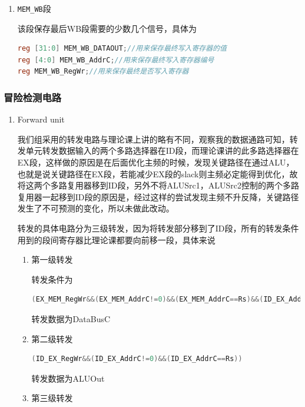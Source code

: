 \documentclass{ctexart}
\begin{document}
\begin{enumerate}
			\item \verb"MEM_WB"段

			该段保存最后WB段需要的少数几个信号，具体为

\begin{lstlisting}[language = verilog]
reg [31:0] MEM_WB_DATAOUT;//用来保存最终写入寄存器的值
reg [4:0] MEM_WB_AddrC;//用来保存最终写入寄存器编号
reg MEM_WB_RegWr;//用来保存最终是否写入寄存器
\end{lstlisting}
			
			\end{enumerate}

			\subsubsection{冒险检测电路}

			\begin{enumerate}
\item Forward unit	

我们组采用的转发电路与理论课上讲的略有不同，观察我的数据通路可知，转发单元转发数据输入的两个多路选择器在ID段，而理论课讲的此多路选择器在EX段，这样做的原因是在后面优化主频的时候，发现关键路径在通过ALU，也就是说关键路径在EX段，若能减少EX段的slack则主频必定能得到优化，故将这两个多路复用器移到ID段，另外不将ALUSrc1，ALUSrc2控制的两个多路复用器一起移到ID段的原因是，经过这样的尝试发现主频不升反降，关键路径发生了不可预测的变化，所以未做此改动。

转发的具体电路分为三级转发，因为将转发部分移到了ID段，所有的转发条件用到的段间寄存器比理论课都要向前移一段，具体来说

\begin{enumerate}
\item 第一级转发

转发条件为

\begin{lstlisting}[language = verilog]
(EX_MEM_RegWr&&(EX_MEM_AddrC!=0)&&(EX_MEM_AddrC==Rs)&&(ID_EX_AddrC!=Rs||~ID_EX_RegWr))
\end{lstlisting}

转发数据为DataBusC

\item 第二级转发
\begin{lstlisting}[language = verilog]
(ID_EX_RegWr&&(ID_EX_AddrC!=0)&&(ID_EX_AddrC==Rs))
\end{lstlisting}

转发数据为ALUOut

\item 第三级转发


\end{enumerate}
\end{enumerate}
\end{document}
